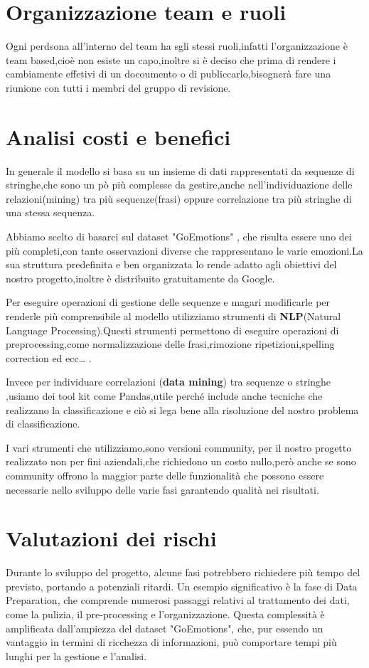 \documentclass{article}
\begin{document}
\section{Organizzazione team e ruoli}\label{sec:organizzazione-team-e-ruoli}
Ogni perdsona all'interno del team ha sgli stessi ruoli,infatti l'organizzazione è team based,cioè non esiste un capo,inoltre si è deciso che prima di rendere i cambiamente effetivi di un docoumento o di publiccarlo,bisognerà fare una riunione con tutti i membri del gruppo di revisione.
\section{Analisi costi e benefici}\label{sec:analisi-costi-e-benefici}
In generale il modello si basa su un insieme di dati rappresentati da sequenze di stringhe,che sono un pò più complesse da gestire,anche nell’individuazione delle relazioni(mining) tra più sequenze(frasi) oppure correlazione tra più stringhe di una stessa sequenza.

Abbiamo scelto di basarci sul dataset "GoEmotions" , che risulta essere uno dei più completi,con tante osservazioni diverse che rappresentano le varie emozioni.La sua struttura predefinita e ben organizzata lo rende adatto agli obiettivi del nostro progetto,inoltre è distribuito gratuitamente da Google.

Per eseguire operazioni di gestione delle sequenze e magari modificarle per renderle più comprensibile al modello utilizziamo strumenti di \textbf{NLP}(Natural Language Processing).Questi strumenti permettono di eseguire operazioni di preprocessing,come normalizzazione delle frasi,rimozione ripetizioni,spelling correction ed ecc… .

Invece per individuare correlazioni (\textbf{data mining}) tra sequenze o stringhe ,usiamo dei tool kit come Pandas,utile perché include anche tecniche che realizzano la classificazione e ciò si lega bene alla risoluzione del nostro problema di classificazione.

I vari strumenti che utilizziamo,sono versioni community, per il nostro progetto realizzato non per fini aziendali,che richiedono un costo nullo,però anche se sono community offrono la maggior parte delle funzionalità che possono essere necessarie nello sviluppo delle varie fasi garantendo qualità nei risultati.

\section{Valutazioni dei rischi}\label{sec:valutazioni-dei-rischi}
Durante lo sviluppo del progetto, alcune fasi potrebbero richiedere più tempo del previsto, portando a potenziali ritardi. Un esempio significativo è la fase di Data Preparation, che comprende numerosi passaggi relativi al trattamento dei dati, come la pulizia, il pre-processing e l'organizzazione. Questa complessità è amplificata dall'ampiezza del dataset "GoEmotions", che, pur essendo un vantaggio in termini di ricchezza di informazioni, può comportare tempi più lunghi per la gestione e l'analisi.
\end{document}
